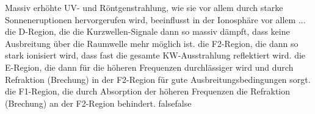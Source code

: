     {Massiv erhöhte UV- und Röntgenstrahlung, wie sie vor allem durch starke Sonneneruptionen hervorgerufen wird, beeinflusst in der Ionosphäre vor allem ...}
    {die D-Region, die die Kurzwellen-Signale dann so massiv dämpft, dass keine Ausbreitung über die Raumwelle mehr möglich ist.}
    {die F2-Region, die dann so stark ionisiert wird, dass fast die gesamte KW-Ausstrahlung reflektiert wird.}
    {die E-Region, die dann für die höheren Frequenzen durchlässiger wird und durch Refraktion (Brechung) in der F2-Region für gute Ausbreitungsbedingungen sorgt.}
    {die F1-Region, die durch Absorption der höheren Frequenzen die Refraktion (Brechung) an der F2-Region behindert.}
    {false}{false}